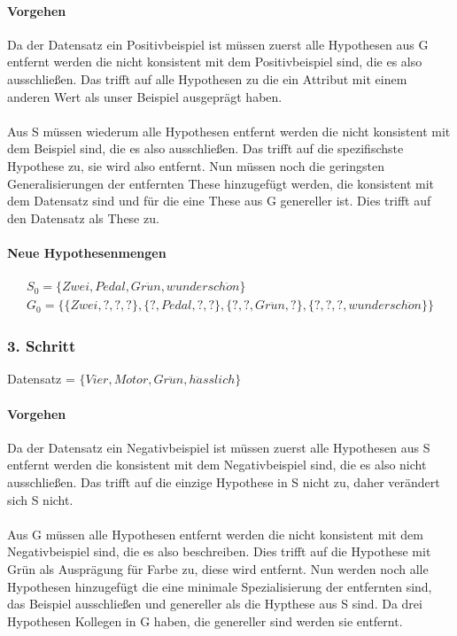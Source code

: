 \documentclass[a4paper]{article}
\begin{document}
\paragraph{Vorgehen}
Da der Datensatz ein Positivbeispiel ist müssen zuerst alle Hypothesen aus G entfernt werden die nicht konsistent mit dem Positivbeispiel sind, die es also ausschließen. Das trifft auf alle Hypothesen zu die ein Attribut mit einem anderen Wert als unser Beispiel ausgeprägt haben.
\paragraph{}
Aus S müssen wiederum alle Hypothesen entfernt werden die nicht konsistent mit dem Beispiel sind, die es also ausschließen. Das trifft auf die spezifischste Hypothese zu, sie wird also entfernt. Nun müssen noch die geringsten Generalisierungen der entfernten These hinzugefügt werden, die konsistent mit dem Datensatz sind und für die eine These aus G genereller ist. Dies trifft auf den Datensatz als These zu.
\paragraph{Neue Hypothesenmengen}
\begin{align*}
	S_0 = \{Zwei,Pedal,Gr\ddot{u}n,wundersch\ddot{o}n\} \\
	G_0 = \{ \{Zwei,?,?,?\},\{?,Pedal,?,?\}, \{?,?,Gr\ddot{u}n,?\}, \{?,?,?,wundersch\ddot{o}n\} \}
\end{align*}

\subsubsection{3. Schritt}
Datensatz = $ \{Vier, Motor, Gr\ddot{u}n, h\ddot{a}sslich\} $
\paragraph{Vorgehen}
Da der Datensatz ein Negativbeispiel ist müssen zuerst alle Hypothesen aus S entfernt werden die konsistent mit dem Negativbeispiel sind, die es also nicht ausschließen. Das trifft auf die einzige Hypothese in S nicht zu, daher verändert sich S nicht.
\paragraph{}
Aus G müssen alle Hypothesen entfernt werden die nicht konsistent mit dem Negativbeispiel sind, die es also beschreiben. Dies trifft auf die Hypothese mit Grün als Ausprägung für Farbe zu, diese wird entfernt. Nun werden noch alle Hypothesen hinzugefügt die eine minimale Spezialisierung der entfernten sind, das Beispiel ausschließen und genereller als die Hypthese aus S sind. Da drei Hypothesen Kollegen in G haben, die genereller sind werden sie entfernt.
\end{document}
